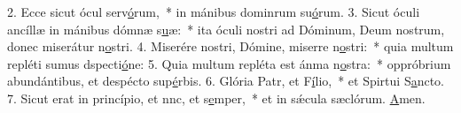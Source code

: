 2. Ecce sicut ócul serv\uline{ó}rum,~* in mánibus dominrum su\uline{ó}rum.
3. Sicut óculi ancíllæ in mánibus dómnæ s\uline{u}æ:~* ita óculi nostri ad Dóminum, Deum nostrum, donec miserátur n\uline{o}stri.
4. Miserére nostri, Dómine, miserre n\uline{o}stri:~* quia multum repléti sumus dspecti\uline{ó}ne:
5. Quia multum repléta est ánma n\uline{o}stra:~* oppróbrium abundántibus, et despécto sup\uline{é}rbis.
6. Glória Patr, et F\uline{í}lio,~* et Spirtui S\uline{a}ncto.
7. Sicut erat in princípio, et nnc, et s\uline{e}mper,~* et in sǽcula sæclórum. \uline{A}men.
